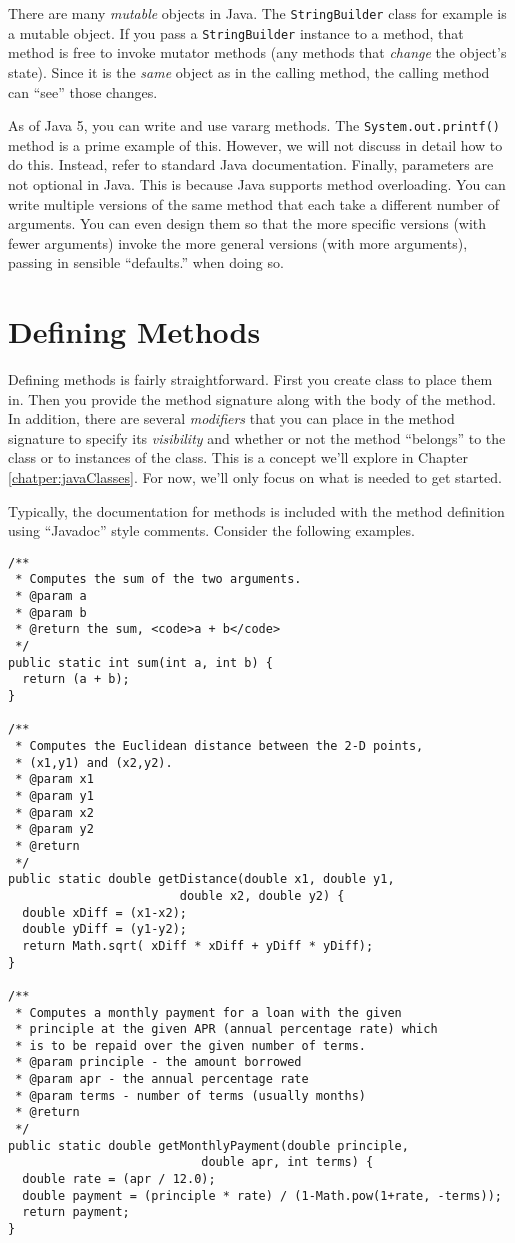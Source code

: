 There are many \emph{mutable} objects in Java.  The 
\texttt{StringBuilder} class for example is a mutable
object.  If you pass a \texttt{StringBuilder} instance
to a method, that method is free to invoke mutator methods 
(any methods that \emph{change} the object's state).  Since
it is the \emph{same} object as in the calling method, the
calling method can ``see'' those changes.

As of Java 5, you can write and use vararg methods.  The
\texttt{System.out.printf()} method is a prime
example of this.  However, we will not discuss in detail how
to do this.  Instead, refer to standard Java documentation.
Finally, parameters are not optional in Java.  This is because
Java supports method overloading.  You can write multiple
versions of the same method that each take a different
number of arguments.  You can even design them so that
the more specific versions (with fewer arguments) invoke
the more general versions (with more arguments), passing
in sensible ``defaults.'' when doing so.

\section{Defining Methods}

Defining methods is fairly straightforward.  First you create 
class to place them in.  Then you provide the method signature
along with the body of the method.  In addition, there are 
several \emph{modifiers} that you can place in the method 
signature to specify its \emph{visibility} and whether or not
the method ``belongs'' to the class or to instances of the 
class.  This is a concept we'll explore in Chapter \ref{chatper:javaClasses}.
For now, we'll only focus on what is needed to get started.

Typically, the documentation for methods is included with 
the method definition using ``Javadoc'' style comments.
Consider the following examples.

\begin{verbatim}
/**
 * Computes the sum of the two arguments.
 * @param a
 * @param b
 * @return the sum, <code>a + b</code>
 */
public static int sum(int a, int b) {
  return (a + b);
}

/**
 * Computes the Euclidean distance between the 2-D points, 
 * (x1,y1) and (x2,y2).
 * @param x1
 * @param y1
 * @param x2
 * @param y2
 * @return
 */
public static double getDistance(double x1, double y1, 
                        double x2, double y2) {
  double xDiff = (x1-x2);
  double yDiff = (y1-y2);
  return Math.sqrt( xDiff * xDiff + yDiff * yDiff);
}

/**
 * Computes a monthly payment for a loan with the given
 * principle at the given APR (annual percentage rate) which
 * is to be repaid over the given number of terms.
 * @param principle - the amount borrowed
 * @param apr - the annual percentage rate
 * @param terms - number of terms (usually months)
 * @return
 */
public static double getMonthlyPayment(double principle, 
                           double apr, int terms) {
  double rate = (apr / 12.0);
  double payment = (principle * rate) / (1-Math.pow(1+rate, -terms));
  return payment;
}
\end{verbatim}

